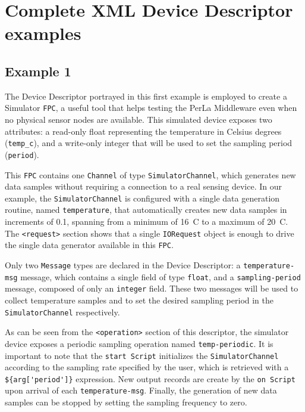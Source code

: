 \chapter{Complete XML Device Descriptor examples}

\section{Example 1}

The Device Descriptor portrayed in this first example is employed to create a
Simulator \texttt{FPC}, a useful tool that helps testing the PerLa Middleware
even when no physical sensor nodes are available. This simulated device exposes
two attributes: a read-only float representing the temperature in Celsius
degrees (\texttt{temp\_c}), and a write-only integer that will be used to set
the sampling period (\texttt{period}).

This \texttt{FPC} contains one \texttt{Channel} of type
\texttt{SimulatorChannel}, which generates new data samples without requiring a
connection to a real sensing device. In our example, the
\texttt{SimulatorChannel} is configured with a single data generation routine,
named \texttt{temperature}, that automatically creates new data samples in
increments of 0.1\degree, spanning from a minimum of 16\degree~C to a maximum
of 20\degree~C. The \lstinline!<request>! section shows that a single
\texttt{IORequest} object is enough to drive the single data generator
available in this \texttt{FPC}.

Only two \texttt{Message} types are declared in the Device Descriptor: a
\texttt{temperature-msg} message, which contains a single field of type
\texttt{float}, and a \texttt{sampling-period} message, composed of only an
\texttt{integer} field. These two messages will be used to collect temperature
samples and to set the desired sampling period in the \texttt{SimulatorChannel}
respectively.

As can be seen from the \lstinline!<operation>! section of this descriptor, the
simulator device exposes a periodic sampling operation named
\texttt{temp-periodic}. It is important to note that the \texttt{start Script}
initializes the \texttt{SimulatorChannel} according to the sampling rate
specified by the user, which is retrieved with a \lstinline!${arg['period']}!
expression. New output records are create by the \texttt{on Script} upon
arrival of each \texttt{temperature-msg}. Finally, the generation of new data
samples can be stopped by setting the sampling frequency to zero.


